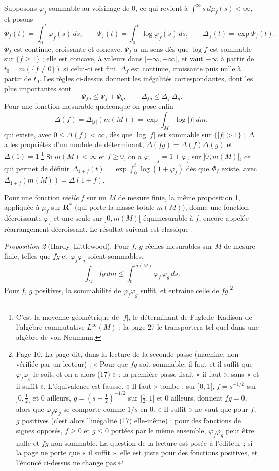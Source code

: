 \documentclass[11pt,a4paper]{article}
\begin{document}
Supposons $\varphi_f$ sommable au voisinage de $0$, ce qui revient à
$\int^\infty s\,d\mu_f(s) < \infty$, et posons
\[
  \Phi_f(t) = \int_0^t \varphi_f(s)\,ds, \qquad
  \Psi_f(t) = \int_0^t \log\varphi_f(s)\,ds, \qquad
  \Delta_f(t) = \exp\Psi_f(t) .
\]
$\Phi_f$ est continue, croissante et concave. $\Psi_f$ a un sens dès que
$\log f$ est sommable sur $\{f \geq 1\}$ ; elle est concave, à valeurs dans
$[-\infty, +\infty[$, et vaut $-\infty$ à partir de $t_0 = m(\{f \neq 0\})$ si
celui-ci est fini. $\Delta_f$ est continue, croissante puis nulle à partir de
$t_0$. Les règles ci-dessus donnent les inégalités correspondantes, dont les
plus importantes sont
\[
  \Psi_{fg} \leq \Psi_f + \Psi_g, \qquad \Delta_{fg} \leq \Delta_f\,\Delta_g .
\]
Pour une fonction mesurable quelconque on pose enfin
\[
  \Delta(f) = \Delta_{|f|}(m(M)) = \exp\int_M \log|f|\,dm,
\]
qui existe, avec $0 \leq \Delta(f) < \infty$, dès que $\log|f|$ est sommable
sur $\{|f| > 1\}$ ; $\Delta$ a les propriétés d'un module de déterminant,
$\Delta(fg) = \Delta(f)\Delta(g)$ et $\Delta(1) = 1$.\footnote{C'est la
moyenne géométrique de $|f|$, le déterminant de Fuglede--Kadison de l'algèbre
commutative $L^\infty(M)$ : la page 27 le transportera tel quel dans une
algèbre de von Neumann.} Si $m(M) < \infty$ et $f \geq 0$, on a
$\varphi_{1+f} = 1 + \varphi_f$ sur $]0, m(M)[$, ce qui permet de définir
$\Delta_{1+f}(t) = \exp\int_0^t \log(1+\varphi_f)$ dès que $\Phi_f$ existe,
avec $\Delta_{1+f}(m(M)) = \Delta(1+f)$.

Pour une fonction \emph{réelle} $f$ sur un $M$ de mesure finie, la même
proposition 1, appliquée à $\mu_f$ sur $\mathbf{R}^{*}$ (qui porte la masse
totale $m(M)$), donne une fonction décroissante $\varphi_f$ et une seule sur
$]0, m(M)[$ équimesurable à $f$, encore appelée réarrangement décroissant.
Le résultat suivant est classique :

\emph{Proposition 2} (Hardy--Littlewood). Pour $f$, $g$ réelles mesurables
sur $M$ de mesure finie, telles que $fg$ et $\varphi_f\varphi_g$ soient
sommables,
\[
  \int_M fg\,dm \leq \int_0^{m(M)} \varphi_f\,\varphi_g\,ds .
\]
Pour $f$, $g$ positives, la sommabilité de $\varphi_f\varphi_g$ suffit, et
entraîne celle de $fg$.\footnote{Page 10. La page dit, dans la lecture de
la seconde passe (machine, non vérifiée par un lecteur) : « Pour que $fg$
soit sommable, il faut et il suffit que $\varphi_f\varphi_g$ le soit, et on
a alors (17) » ; la première passe lisait « il faut », sans « et il
suffit ». L'équivalence est fausse. « Il faut » tombe : sur $]0,1[$,
$f = s^{-1/2}$ sur $]0,\frac12[$ et $0$ ailleurs, $g = (s - \frac12)^{-1/2}$
sur $]\frac12, 1[$ et $0$ ailleurs, donnent $fg = 0$, alors que
$\varphi_f\varphi_g$ se comporte comme $1/s$ en $0$. « Il suffit » ne
vaut que pour $f$, $g$ positives (c'est alors l'inégalité (17) elle-même) :
pour des fonctions de signes opposés, $f \geq 0$ et $g \leq 0$ portées par
le même ensemble, $\varphi_f\varphi_g$ peut être nulle et $fg$ non
sommable. La question de la lecture est posée à l'éditeur ; si la page ne
porte que « il suffit », elle est juste pour des fonctions positives, et
l'énoncé ci-dessus ne change pas.}
\end{document}
